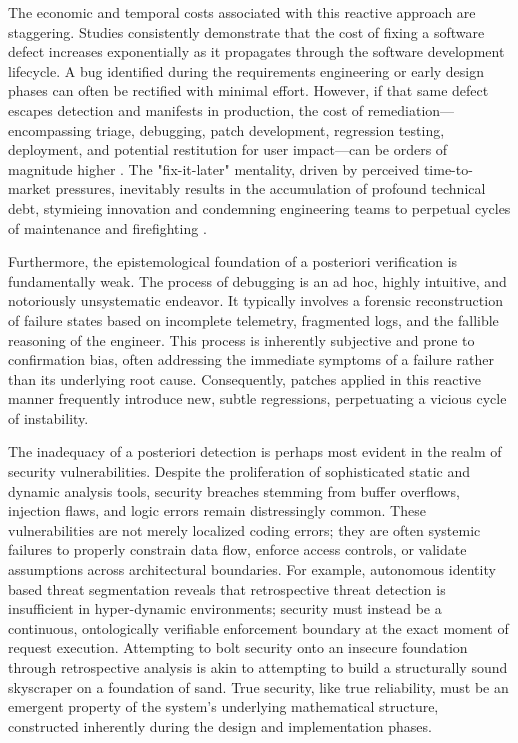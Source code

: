 The economic and temporal costs associated with this reactive approach are staggering. Studies consistently demonstrate that the cost of fixing a software defect increases exponentially as it propagates through the software development lifecycle. A bug identified during the requirements engineering or early design phases can often be rectified with minimal effort. However, if that same defect escapes detection and manifests in production, the cost of remediation—encompassing triage, debugging, patch development, regression testing, deployment, and potential restitution for user impact—can be orders of magnitude higher \cite{boehm2001software}. The "fix-it-later" mentality, driven by perceived time-to-market pressures, inevitably results in the accumulation of profound technical debt, stymieing innovation and condemning engineering teams to perpetual cycles of maintenance and firefighting \cite{cunningham1992wycash}.

Furthermore, the epistemological foundation of a posteriori verification is fundamentally weak. The process of debugging is an ad hoc, highly intuitive, and notoriously unsystematic endeavor. It typically involves a forensic reconstruction of failure states based on incomplete telemetry, fragmented logs, and the fallible reasoning of the engineer. This process is inherently subjective and prone to confirmation bias, often addressing the immediate symptoms of a failure rather than its underlying root cause. Consequently, patches applied in this reactive manner frequently introduce new, subtle regressions, perpetuating a vicious cycle of instability.

The inadequacy of a posteriori detection is perhaps most evident in the realm of security vulnerabilities. Despite the proliferation of sophisticated static and dynamic analysis tools, security breaches stemming from buffer overflows, injection flaws, and logic errors remain distressingly common. These vulnerabilities are not merely localized coding errors; they are often systemic failures to properly constrain data flow, enforce access controls, or validate assumptions across architectural boundaries. For example, autonomous identity based threat segmentation \cite{ref_AutonomousIdent7} reveals that retrospective threat detection is insufficient in hyper-dynamic environments; security must instead be a continuous, ontologically verifiable enforcement boundary at the exact moment of request execution. Attempting to bolt security onto an insecure foundation through retrospective analysis is akin to attempting to build a structurally sound skyscraper on a foundation of sand. True security, like true reliability, must be an emergent property of the system's underlying mathematical structure, constructed inherently during the design and implementation phases.

